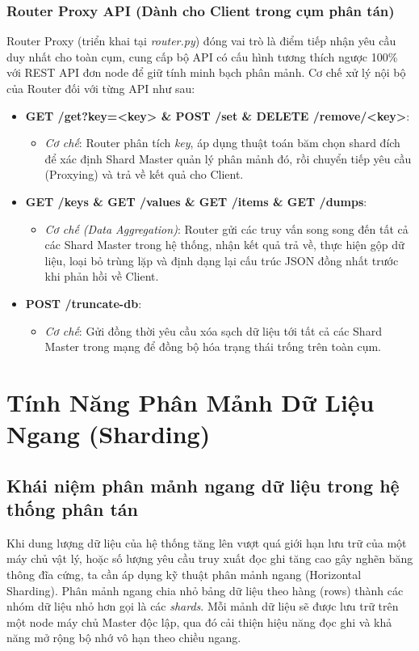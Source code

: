 \documentclass[12pt,a4paper]{report}
\begin{document}
\subsection{Router Proxy API (Dành cho Client trong cụm phân tán)}
Router Proxy (triển khai tại \textit{router.py}) đóng vai trò là điểm tiếp nhận yêu cầu duy nhất cho toàn cụm, cung cấp bộ API có cấu hình tương thích ngược 100\% với REST API đơn node để giữ tính minh bạch phân mảnh. Cơ chế xử lý nội bộ của Router đối với từng API như sau:
\begin{itemize}
    \item \textbf{GET /get?key=<key> \& POST /set \& DELETE /remove/<key>}:
        \begin{itemize}
            \item \textit{Cơ chế}: Router phân tích \textit{key}, áp dụng thuật toán băm chọn shard đích để xác định Shard Master quản lý phân mảnh đó, rồi chuyển tiếp yêu cầu (Proxying) và trả về kết quả cho Client.
        \end{itemize}
    \item \textbf{GET /keys \& GET /values \& GET /items \& GET /dumps}:
        \begin{itemize}
            \item \textit{Cơ chế (Data Aggregation)}: Router gửi các truy vấn song song đến tất cả các Shard Master trong hệ thống, nhận kết quả trả về, thực hiện gộp dữ liệu, loại bỏ trùng lặp và định dạng lại cấu trúc JSON đồng nhất trước khi phản hồi về Client.
        \end{itemize}
    \item \textbf{POST /truncate-db}:
        \begin{itemize}
            \item \textit{Cơ chế}: Gửi đồng thời yêu cầu xóa sạch dữ liệu tới tất cả các Shard Master trong mạng để đồng bộ hóa trạng thái trống trên toàn cụm.
        \end{itemize}
\end{itemize}

\newpage

\chapter{Tính Năng Phân Mảnh Dữ Liệu Ngang (Sharding)}
\section{Khái niệm phân mảnh ngang dữ liệu trong hệ thống phân tán}
Khi dung lượng dữ liệu của hệ thống tăng lên vượt quá giới hạn lưu trữ của một máy chủ vật lý, hoặc số lượng yêu cầu truy xuất đọc ghi tăng cao gây nghẽn băng thông đĩa cứng, ta cần áp dụng kỹ thuật phân mảnh ngang (Horizontal Sharding). Phân mảnh ngang chia nhỏ bảng dữ liệu theo hàng (rows) thành các nhóm dữ liệu nhỏ hơn gọi là các \textit{shards}. Mỗi mảnh dữ liệu sẽ được lưu trữ trên một node máy chủ Master độc lập, qua đó cải thiện hiệu năng đọc ghi và khả năng mở rộng bộ nhớ vô hạn theo chiều ngang.
\end{document}
